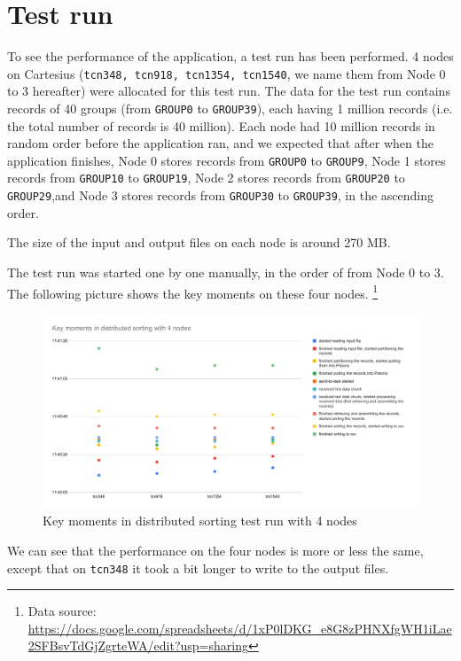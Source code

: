 \documentclass{article}
\begin{document}
\section{Test run}
To see the performance of the application, a test run has been performed.
4 nodes on Cartesius (\texttt{tcn348, tcn918, tcn1354, tcn1540}, we name them from Node 0 to 3 hereafter) were allocated for this test run.
The data for the test run contains records of 40 groups (from \texttt{GROUP0} to \texttt{GROUP39}), each having 1 million records (i.e. the total number of records is 40 million).
Each node had 10 million records in random order before the application ran, and we expected that after when the application finishes,
Node 0 stores records from \texttt{GROUP0} to \texttt{GROUP9},
Node 1 stores records from \texttt{GROUP10} to \texttt{GROUP19},
Node 2 stores records from \texttt{GROUP20} to \texttt{GROUP29},and
Node 3 stores records from \texttt{GROUP30} to \texttt{GROUP39}, in the ascending order.

The size of the input and output files on each node is around 270 MB.

The test run was started one by one manually, in the order of from Node 0 to 3.
The following picture shows the key moments on these four nodes.
\footnote{Data source: \url{https://docs.google.com/spreadsheets/d/1xP0lDKG_e8G8zPHNXfgWH1iLae2SFBsvTdGjZgrteWA/edit?usp=sharing}}

\begin{figure}[h!]
    \caption{Key moments in distributed sorting test run with 4 nodes}
    \centering
      \includegraphics[width=1.4\textwidth]{key_moments}
  \end{figure}

We can see that the performance on the four nodes is more or less the same, except that on \texttt{tcn348} it took a bit longer to write to the output files.
\end{document}
